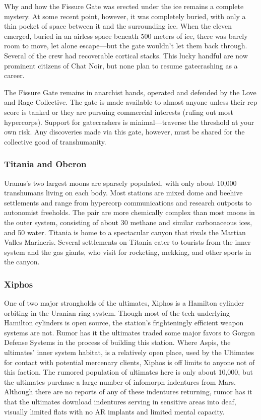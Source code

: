 Why and how the Fissure Gate was erected under the ice remains a
complete mystery. At some recent point, however, it was completely
buried, with only a thin pocket of space between it and the
surrounding ice. When the eleven emerged, buried in an airless space
beneath 500 meters of ice, there was barely room to move, let alone
escape—but the gate wouldn't let them back through. Several of the
crew had recoverable cortical stacks. This lucky handful are now
prominent citizens of Chat Noir, but none plan to resume gatecrashing
as a career.

The Fissure Gate remains in anarchist hands, operated and defended by
the Love and Rage Collective. The gate is made available to almost
anyone unless their rep score is tanked or they are pursuing
commercial interests (ruling out most hypercorps).  Support for
gatecrashers is minimal—traverse the threshold at your own risk. Any
discoveries made via this gate, however, must be shared for the
collective good of transhumanity.

\subsubsection{Titania and Oberon}
\label{sec:titania-oberon}

Uranus's two largest moons are sparsely populated, with only about
10,000 transhumans living on each body. Most stations are mixed dome
and beehive settlements and range from hypercorp communications and
research outposts to autonomist freeholds. The pair are more
chemically complex than most moons in the outer system, consisting of
about 30%
methane and similar carbonaceous ices, and 50%
water. Titania is home to a spectacular canyon that rivals the Martian
Valles Marineris. Several settlements on Titania cater to tourists
from the inner system and the gas giants, who visit for rocketing,
mekking, and other sports in the canyon.

\subsubsection{Xiphos}
\label{sec:xiphos}

One of two major strongholds of the ultimates, Xiphos is a Hamilton
cylinder orbiting in the Uranian ring system. Though most of the tech
underlying Hamilton cylinders is open source, the station's
frighteningly efficient weapon systems are not. Rumor has it the
ultimates traded some major favors to Gorgon Defense Systems in the
process of building this station.  Where Aspis, the ultimates' inner
system habitat, is a relatively open place, used by the Ultimates for
contact with potential mercenary clients, Xiphos is off limits to
anyone not of this faction. The rumored population of ultimates here
is only about 10,000, but the ultimates purchase a large number of
infomorph indentures from Mars. Although there are no reports of any
of these indentures returning, rumor has it that the ultimates
download indentures serving in sensitive areas into deaf, visually
limited flats with no AR implants and limited mental capacity.

